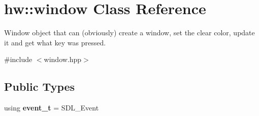 \hypertarget{classhw_1_1window}{}\section{hw\+:\+:window Class Reference}
\label{classhw_1_1window}


Window object that can (obviously) create a window, set the clear color, update it and get what key was pressed.  




{\ttfamily \#include $<$window.\+hpp$>$}

\subsection*{Public Types}
\begin{DoxyCompactItemize}
\item 
\mbox{\label{classhw_1_1window_a02b105bed15155f25c35e4e0dadc02c8}} 
using {\bfseries event\+\_\+t} = S\+D\+L\+\_\+\+Event
\end{DoxyCompactItemize}
